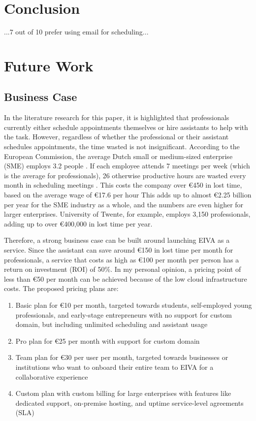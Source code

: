 \documentclass{article}
\begin{document}
\newpage

\section{Conclusion}

...7 out of 10 prefer using email for scheduling...

\newpage

\section{Future Work}

\subsection{Business Case}

In the literature research for this paper, it is highlighted that professionals currently either schedule appointments themselves or hire assistants to help with the task. However, regardless of whether the professional or their assistant schedules appointments, the time wasted is not insignificant. According to the European Commission, the average Dutch small or medium-sized enterprise (SME) employs 3.2 people \cite{noauthor_2019_2019}. If each employee attends 7 meetings per week (which is the average for professionals), 26 otherwise productive hours are wasted every month in scheduling meetings \cite{kincaid_electronic_1985}. This costs the company over €450 in lost time, based on the average wage of €17.6 per hour \cite{noauthor_salary_nodate} This adds up to almost €2.25 billion per year for the SME industry as a whole, and the numbers are even higher for larger enterprises. University of Twente, for example, employs 3,150 professionals, adding up to over €400,000 in lost time per year.

Therefore, a strong business case can be built around launching EIVA as a service. Since the assistant can save around €150 in lost time per month for professionals, a service that costs as high as €100 per month per person has a return on investment (ROI) of 50\%. In my personal opinion, a pricing point of less than €50 per month can be achieved because of the low cloud infrastructure costs. The proposed pricing plans are:

\begin{enumerate}
	\item Basic plan for €10 per month, targeted towards students, self-employed young professionals, and early-stage entrepreneurs with no support for custom domain, but including unlimited scheduling and assistant usage
	\item Pro plan for €25 per month with support for custom domain
	\item Team plan for €30 per user per month, targeted towards businesses or institutions who want to onboard their entire team to EIVA for a collaborative experience
	\item Custom plan with custom billing for large enterprises with features like dedicated support, on-premise hosting, and uptime service-level agreements (SLA)
\end{enumerate}
\end{document}
